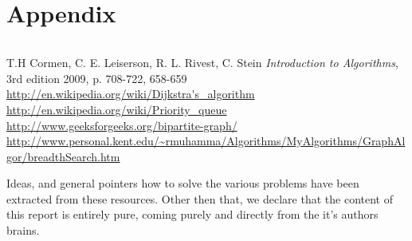\documentclass[a4paper]{article}
\begin{document}
\section{Appendix}

\begin{lstlisting}
\end{lstlisting}

\begin{thebibliography}{9}
		T.H Cormen, C. E. Leiserson, R. L. Rivest, C. Stein 	
				\textit{Introduction to Algorithms}, 3rd edition 2009, p. 708-722, 658-659 \\
		\url{http://en.wikipedia.org/wiki/Dijkstra's\_algorithm} \\
		\url{http://en.wikipedia.org/wiki/Priority\_queue} \\
		\url{http://www.geeksforgeeks.org/bipartite-graph/}
		\url{http://www.personal.kent.edu/~rmuhamma/Algorithms/MyAlgorithms/GraphAlgor/breadthSearch.htm}
\end{thebibliography}

Ideas, and general pointers how to solve the various problems have been extracted from these resources. Other then that, we declare that the content of this report is entirely pure, coming purely and directly from the it's authors brains.  
\end{document}

